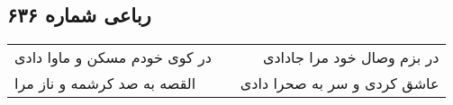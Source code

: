 \begin{center}
\section*{رباعی شماره ۶۳۶}
\label{sec:sh636}
\begin{longtable}{l p{0.5cm} r}
در کوی خودم مسکن و ماوا دادی
&&
در بزم وصال خود مرا جادادی
\\
القصه به صد کرشمه و ناز مرا
&&
عاشق کردی و سر به صحرا دادی
\\
\end{longtable}
\end{center}
